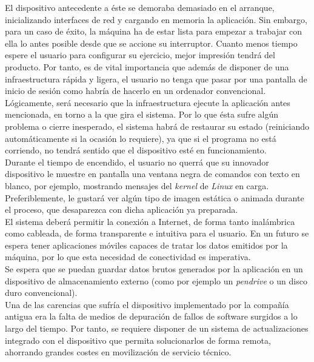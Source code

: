 El dispositivo antecedente a éste se demoraba demasiado en el arranque, inicializando interfaces de red y cargando en memoria la aplicación. Sin embargo, para un caso de éxito, la máquina ha de estar lista para empezar a trabajar con ella lo antes posible desde que se accione su interruptor. Cuanto menos tiempo espere el usuario para configurar su ejercicio, mejor impresión tendrá del producto. Por tanto, es de vital importancia que además de disponer de una infraestructura rápida y ligera, el usuario no tenga que pasar por una pantalla de inicio de sesión como habría de hacerlo en un ordenador convencional.\\

Lógicamente, será necesario que la infraestructura ejecute la aplicación antes mencionada, en torno a la que gira el sistema. Por lo que ésta sufre algún problema o cierre inesperado, el sistema habrá de restaurar su estado (reiniciando automáticamente si la ocasión lo requiere), ya que si el programa no está corriendo, no tendrá sentido que el dispositivo esté en funcionamiento.\\

Durante el tiempo de encendido, el usuario no querrá que su innovador dispositivo le muestre en pantalla una ventana negra de comandos con texto en blanco, por ejemplo, mostrando mensajes del \textit{kernel} de \textit{Linux} en carga. Preferiblemente, le gustará ver algún tipo de imagen estática o animada durante el proceso, que desaparezca con dicha aplicación ya preparada.\\

El sistema deberá permitir la conexión a Internet, de forma tanto inalámbrica como cableada, de forma transparente e intuitiva para el usuario. En un futuro se espera tener aplicaciones móviles capaces de tratar los datos emitidos por la máquina, por lo que esta necesidad de conectividad es imperativa.\\

Se espera que se puedan guardar datos brutos generados por la aplicación en un dispositivo de almacenamiento externo (como por ejemplo un \textit{pendrive} o un disco duro convencional).\\

Una de las carencias que sufría el dispositivo implementado por la compañía antigua era la falta de medios de depuración de fallos de software surgidos a lo largo del tiempo. Por tanto, se requiere disponer de un sistema de actualizaciones integrado con el dispositivo que permita solucionarlos de forma remota, ahorrando grandes costes en movilización de servicio técnico.\\

